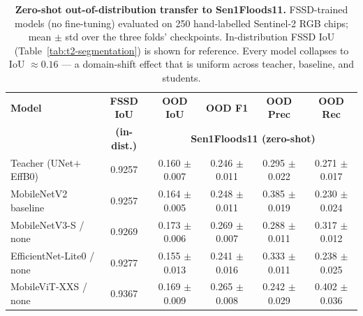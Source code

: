 \begin{table}[ht]
\centering
\caption{\textbf{Zero-shot out-of-distribution transfer to Sen1Floods11.} FSSD-trained models (no fine-tuning) evaluated on 250 hand-labelled Sentinel-2 RGB chips; mean $\pm$ std over the three folds' checkpoints. In-distribution FSSD IoU (Table~\ref{tab:t2-segmentation}) is shown for reference. Every model collapses to IoU $\approx 0.16$ --- a domain-shift effect that is uniform across teacher, baseline, and students.}
\label{tab:t6-ood}
\small
\setlength{\tabcolsep}{5pt}
\begin{tabular}{lccccc}
\toprule
\textbf{Model} & \textbf{FSSD IoU} & \textbf{OOD IoU} & \textbf{OOD F1} & \textbf{OOD Prec} & \textbf{OOD Rec} \\
               & \textbf{(in-dist.)} & \multicolumn{4}{c}{\textbf{Sen1Floods11 (zero-shot)}} \\
\midrule
Teacher (UNet$+$EffB0)      & 0.9257 & 0.160 $\pm$ 0.007 & 0.246 $\pm$ 0.011 & 0.295 $\pm$ 0.022 & 0.271 $\pm$ 0.017 \\
MobileNetV2 baseline        & 0.9257 & 0.164 $\pm$ 0.005 & 0.248 $\pm$ 0.011 & 0.385 $\pm$ 0.019 & 0.230 $\pm$ 0.024 \\
MobileNetV3-S / none        & 0.9269 & 0.173 $\pm$ 0.006 & 0.269 $\pm$ 0.007 & 0.288 $\pm$ 0.011 & 0.317 $\pm$ 0.012 \\
EfficientNet-Lite0 / none   & 0.9277 & 0.155 $\pm$ 0.013 & 0.241 $\pm$ 0.016 & 0.333 $\pm$ 0.011 & 0.238 $\pm$ 0.025 \\
MobileViT-XXS / none        & 0.9367 & 0.169 $\pm$ 0.009 & 0.265 $\pm$ 0.008 & 0.242 $\pm$ 0.029 & 0.402 $\pm$ 0.036 \\
\bottomrule
\end{tabular}
\end{table}
